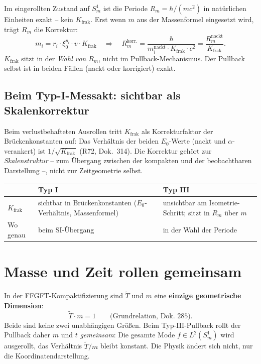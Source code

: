 Im eingerollten Zustand auf $S^1_m$ ist die Periode
$R_m=\hbar/(mc^2)$ in natürlichen Einheiten exakt -- kein
$K_{\text{frak}}$. Erst wenn $m$ aus der Massenformel eingesetzt wird,
trägt $R_m$ die Korrektur:
\[
  m_i = r_i\cdot\xi_0^{p_i}\cdot v\cdot K_{\text{frak}}
  \quad\Rightarrow\quad
  R_m^{\text{korr.}} = \frac{\hbar}{m_i^{\text{nackt}}\cdot K_{\text{frak}}\cdot c^2}
  = \frac{R_m^{\text{nackt}}}{K_{\text{frak}}}.
\]
$K_{\text{frak}}$ sitzt in der \emph{Wahl von $R_m$}, nicht im
Pullback-Mechanismus. Der Pullback selbst ist in beiden Fällen
(nackt oder korrigiert) exakt.

\subsection{Beim Typ-I-Messakt: sichtbar als Skalenkorrektur}

Beim verlustbehafteten Ausrollen tritt $K_{\text{frak}}$ als
Korrekturfaktor der Brückenkonstanten auf: Das Verhältnis der beiden
$E_0$-Werte (nackt und $\alpha$-verankert) ist $1/\sqrt{K_{\text{frak}}}$
(R72, Dok.~314). Die Korrektur gehört zur \emph{Skalenstruktur} -- zum
Übergang zwischen der kompakten und der beobachtbaren Darstellung --,
nicht zur Zeitgeometrie selbst.

\begin{center}
\begin{tabular}{lp{4.5cm}p{4.5cm}}
\toprule
 & \textbf{Typ I} & \textbf{Typ III} \\
\midrule
$K_{\text{frak}}$ & sichtbar in Brückenkonstanten
  ($E_0$-Verhältnis, Massenformel) & unsichtbar am Isometrie-Schritt;
  sitzt in $R_m$ über $m$ \\
Wo genau & beim SI-Übergang & in der Wahl der Periode \\
\bottomrule
\end{tabular}
\end{center}

\section{Masse und Zeit rollen gemeinsam}

In der FFGFT-Kompaktifizierung sind $\tilde{T}$ und $m$ eine
\textbf{einzige geometrische Dimension}:
\[
  \tilde{T}\cdot m = 1 \qquad \text{(Grundrelation, Dok.~285)}.
\]
Beide sind keine zwei unabhängigen Größen. Beim Typ-III-Pullback
rollt der Pullback daher $m$ und $t$ \emph{gemeinsam}: Die gesamte
Mode $f\in L^2(S^1_m)$ wird ausgerollt, das Verhältnis $\tilde{T}/m$
bleibt konstant. Die Physik ändert sich nicht, nur die
Koordinatendarstellung.


